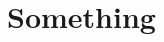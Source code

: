 \documentclass[12pt]{article}
\title{}
\author{}
\begin{document}
\maketitle
\tableofcontents
\newpage
\section{Something}
\end{document}
